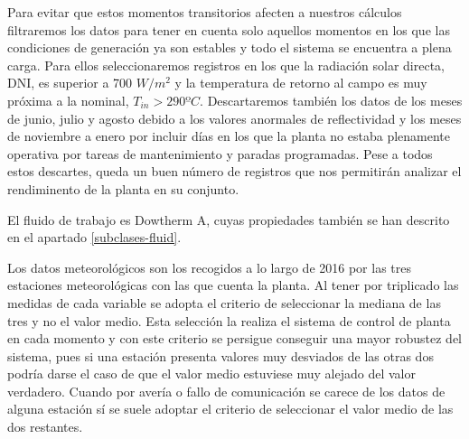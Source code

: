Para evitar que estos momentos transitorios afecten a nuestros cálculos filtraremos los datos para tener en cuenta solo aquellos momentos en los que las condiciones de generación ya son estables y todo el sistema se encuentra a plena carga. Para ellos seleccionaremos registros en los que la radiación solar directa, DNI, es superior a 700 $W/m^2$ y la temperatura de retorno al campo es muy próxima a la nominal, $T_{in}>290ºC$. Descartaremos también los datos de los meses de junio, julio y agosto debido a los valores anormales de reflectividad y los meses de noviembre a enero por incluir días en los que la planta no estaba plenamente operativa por tareas de mantenimiento y paradas programadas. Pese a todos estos descartes, queda un buen número de registros que nos permitirán analizar el rendiminento de la planta en su conjunto.

El fluido de trabajo es Dowtherm A, cuyas propiedades también se han descrito en el apartado \ref{subclases-fluid}.

Los datos meteorológicos son los recogidos a lo largo de 2016 por las tres estaciones meteorológicas con las que cuenta la planta. Al tener por triplicado las medidas de cada variable se adopta el criterio de seleccionar la mediana de las tres y no el valor medio. Esta selección la realiza el sistema de control de planta en cada momento y con este criterio se persigue conseguir una mayor robustez del sistema, pues si una estación presenta valores muy desviados de las otras dos podría darse el caso de que el valor medio estuviese muy alejado del valor  verdadero. Cuando por avería o fallo de comunicación se carece de los datos de alguna estación sí se suele adoptar el criterio de seleccionar el valor medio de las dos restantes.


